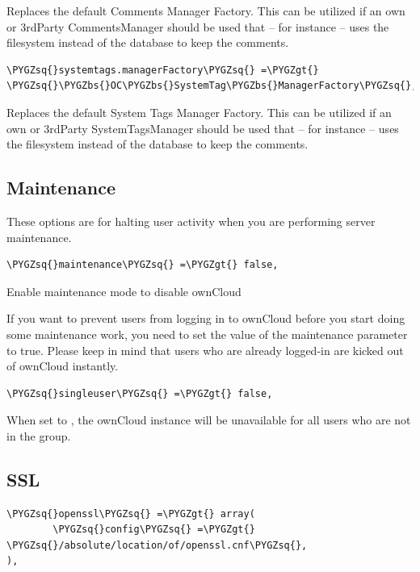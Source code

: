 \documentclass[letterpaper,10pt,english]{sphinxmanual}
\def\PYGZbs{\char`\\}
\def\PYGZgt{\char`\>}
\def\PYGZsq{\char`\'}
\begin{document}
Replaces the default Comments Manager Factory. This can be utilized if an
own or 3rdParty CommentsManager should be used that – for instance – uses the
filesystem instead of the database to keep the comments.

\begin{Verbatim}[commandchars=\\\{\}]
\PYGZsq{}systemtags.managerFactory\PYGZsq{} =\PYGZgt{} \PYGZsq{}\PYGZbs{}OC\PYGZbs{}SystemTag\PYGZbs{}ManagerFactory\PYGZsq{},
\end{Verbatim}

Replaces the default System Tags Manager Factory. This can be utilized if an
own or 3rdParty SystemTagsManager should be used that – for instance – uses the
filesystem instead of the database to keep the comments.


\subsection{Maintenance}
\label{configuration_server/config_sample_php_parameters:maintenance}
These options are for halting user activity when you are performing server
maintenance.

\begin{Verbatim}[commandchars=\\\{\}]
\PYGZsq{}maintenance\PYGZsq{} =\PYGZgt{} false,
\end{Verbatim}

Enable maintenance mode to disable ownCloud

If you want to prevent users from logging in to ownCloud before you start
doing some maintenance work, you need to set the value of the maintenance
parameter to true. Please keep in mind that users who are already logged-in
are kicked out of ownCloud instantly.

\begin{Verbatim}[commandchars=\\\{\}]
\PYGZsq{}singleuser\PYGZsq{} =\PYGZgt{} false,
\end{Verbatim}

When set to , the ownCloud instance will be unavailable for all users
who are not in the  group.


\subsection{SSL}
\label{configuration_server/config_sample_php_parameters:ssl}
\begin{Verbatim}[commandchars=\\\{\}]
\PYGZsq{}openssl\PYGZsq{} =\PYGZgt{} array(
        \PYGZsq{}config\PYGZsq{} =\PYGZgt{} \PYGZsq{}/absolute/location/of/openssl.cnf\PYGZsq{},
),
\end{Verbatim}
\end{document}
